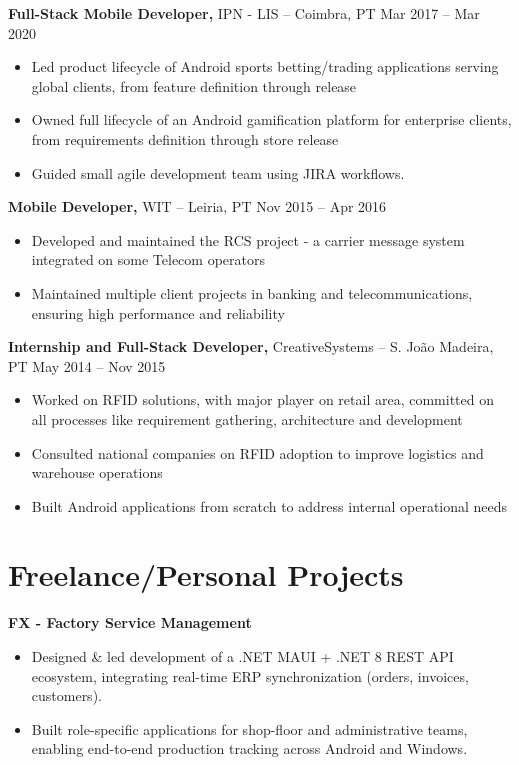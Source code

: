 \documentclass[11pt]{article}       %
\begin{document}
\textbf{Full-Stack Mobile Developer,} {IPN - LIS} -- Coimbra, PT \hfill Mar 2017 -- Mar 2020 \\
\vspace{-9pt}
\begin{itemize}
  \item Led product lifecycle of Android sports betting/trading applications serving global clients, from feature definition through release
  \item Owned full lifecycle of an Android gamification platform for enterprise clients, from requirements definition through store release
  \item Guided small agile development team using JIRA workflows.
\end{itemize}

\textbf{Mobile Developer,} {WIT} -- Leiria, PT \hfill Nov 2015 -- Apr 2016 \\
\vspace{-9pt}
\begin{itemize}
  \item Developed and maintained the RCS project - a carrier message system integrated on some Telecom operators
  \item Maintained multiple client projects in banking and telecommunications, ensuring high performance and reliability
\end{itemize}

\textbf{Internship and Full-Stack Developer,} {CreativeSystems} -- S. João Madeira, PT \hfill May 2014 -- Nov 2015 \\
\vspace{-9pt}
\begin{itemize}
  \item Worked on RFID solutions, with major player on retail area, committed on all processes like requirement gathering, architecture and development
  \item Consulted national companies on RFID adoption to improve logistics and warehouse operations
  \item Built Android applications from scratch to address internal operational needs
\end{itemize}

\vspace{-18.5pt}

\section*{Freelance/Personal Projects}
\textbf{FX - Factory Service Management}
\vspace{-6pt}
\begin{itemize}
  \item Designed \& led development of a .NET MAUI + .NET 8 REST API ecosystem, integrating real-time ERP synchronization (orders, invoices, customers).
  \item Built role-specific applications for shop-floor and administrative teams, enabling end-to-end production tracking across Android and Windows.
\end{itemize}
\end{document}
